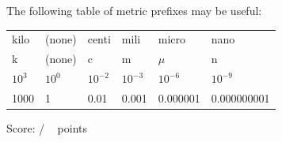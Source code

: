 \documentclass[addpoints,12pt]{exam}
\begin{document}
The following table of metric prefixes may be useful:
\vspace{0.2in}

\begin{tabularx}{\textwidth}{ X X X X X X }
	kilo & (none) & centi & mili & micro & nano \\
	k & (none) & c & m & $\mu$ & n \\
	$10^3$ & $10^0$ & $10^{-2}$ & $10^{-3}$ & $10^{-6}$ & $10^{-9}$ \\
	1000 & 1 & 0.01 & 0.001 & 0.000001 & 0.000000001 
\end{tabularx}
 
\clearpage

\begin{flushright}
Score: \hspace{0.2in} / \numpoints ~ points
\end{flushright}
\end{document}
